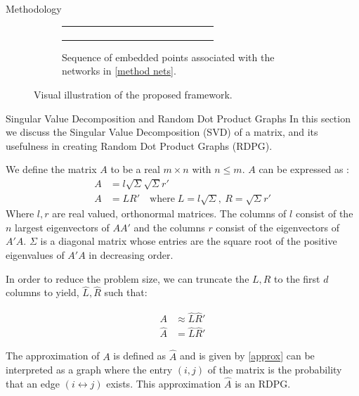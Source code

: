 \documentclass[12pt]{amsbook}
\begin{document}
\begin{chapter}{Methodology}
\begin{figure}[H]
\begin{subfigure}[c]{1\textwidth}
\begin{tabular}{llll}
\begin{subfigure}[c]{0.31\textwidth}
\begin{subfigure}[p]{1\textwidth}
                    \end{subfigure}
                \end{subfigure}
                
                \end{tabular}
                \caption{Sequence of embedded points associated with the networks in \cref{method nets}.}
                \label{method plots}
                
            \end{subfigure}

            \caption{Visual illustration of the proposed framework.}
            \label{framework illustration}
        \end{figure} 

    \begin{section}{Singular Value Decomposition and Random Dot Product Graphs}
        \label{svd}
        In this section we discuss the Singular Value Decomposition (SVD) of a matrix, and its usefulness in creating Random Dot Product Graphs (RDPG).

        We define the matrix $A$ to be a real $m \times n$ with $n \le m$. $A$ can be expressed as \cite{forsythe1967computer}:
        \begin{align}
            A&=l\sqrt{\Sigma} \sqrt{\Sigma} r' \\
            A&=L R' \quad \text{where} \; L=l\sqrt \Sigma,\: R=\sqrt \Sigma r'
        \end{align}
        Where $l, r$ are real valued, orthonormal matrices. The columns of $l$ consist of the $n$ largest eigenvectors of $AA'$ and the columns $r$ consist of the eigenvectors of $A'A$. $\Sigma$ is a diagonal matrix whose entries are the square root of the positive eigenvalues of $A'A$ in decreasing order.

        In order to reduce the problem size, we can truncate the $L,R$ to the first $d$ columns to yield, $\hat L, \hat R$ such that:

        \begin{align}
            A &\approx \hat L \hat R' \\
            \hat A &= \hat L \hat R'
            \label{approx}
        \end{align}


        The approximation of $A$ is defined as $\hat A$ and is given by \cref{approx} can be interpreted as a graph where the entry $(i,j)$ of the matrix is the probability that an edge $(i \leftrightarrow j)$ exists. This approximation $\hat A$ is an RDPG\cite{athreya2017statistical}.


\end{section}
\end{chapter}
\end{document}
